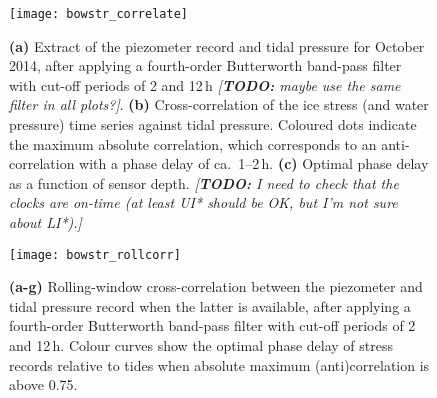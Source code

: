 \documentclass[utf8]{article}
\newcommand{\todo}[1]{\textcolor{c3}{\emph{[\textbf{TODO:} #1]}}}
\begin{document}
    \begin{figure}
      \centerline{\texttt{[image: bowstr\_correlate]}}
      \caption{%
        \textbf{(a)}
          Extract of the piezometer record and tidal pressure for October 2014,
          after applying a fourth-order Butterworth band-pass filter with
          cut-off periods of 2 and 12\,h \todo{maybe use the same filter in all
          plots?}.
        \textbf{(b)}
          Cross-correlation of the ice stress (and water pressure) time series
          against tidal pressure. Coloured dots indicate the maximum absolute
          correlation, which corresponds to an anti-correlation with a phase
          delay of ca.~1--2\,h.
        \textbf{(c)}
          Optimal phase delay as a function of sensor depth.
        \todo{
          I need to check that the clocks are on-time (at least UI* should be
          OK, but I'm not sure about LI*).}}
      \label{fig:correlate}
    \end{figure}

    \begin{figure}
      \centerline{\texttt{[image: bowstr\_rollcorr]}}
      \caption{%
        \textbf{(a-g)}
          Rolling-window cross-correlation between the piezometer and tidal
          pressure record when the latter is available, after applying a
          fourth-order Butterworth band-pass filter with cut-off periods of 2
          and 12\,h. Colour curves show the optimal phase delay of stress
          records relative to tides when absolute maximum (anti)correlation is
          above 0.75.}
      \label{fig:rollcorr}
    \end{figure}


\end{document}
